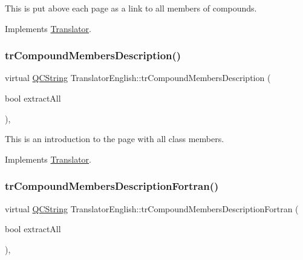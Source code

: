 This is put above each page as a link to all members of compounds. 

Implements \mbox{\hyperlink{class_translator}{Translator}}.

\mbox{\label{class_translator_english_a1188f99926661ac7d8ed0ce8c0f86e62}} 
\subsubsection{\texorpdfstring{trCompoundMembersDescription()}{trCompoundMembersDescription()}}
{\footnotesize\ttfamily virtual \mbox{\hyperlink{class_q_c_string}{Q\+C\+String}} Translator\+English\+::tr\+Compound\+Members\+Description (\begin{DoxyParamCaption}\item[{bool}]{extract\+All }\end{DoxyParamCaption})\hspace{0.3cm}{\ttfamily [inline]}, {\ttfamily [virtual]}}

This is an introduction to the page with all class members. 

Implements \mbox{\hyperlink{class_translator}{Translator}}.

\mbox{\label{class_translator_english_a8635d2e9e2e4d18ab2c52214380f0e50}} 
\subsubsection{\texorpdfstring{trCompoundMembersDescriptionFortran()}{trCompoundMembersDescriptionFortran()}}
{\footnotesize\ttfamily virtual \mbox{\hyperlink{class_q_c_string}{Q\+C\+String}} Translator\+English\+::tr\+Compound\+Members\+Description\+Fortran (\begin{DoxyParamCaption}\item[{bool}]{extract\+All }\end{DoxyParamCaption})\hspace{0.3cm}{\ttfamily [inline]}, {\ttfamily [virtual]}}

